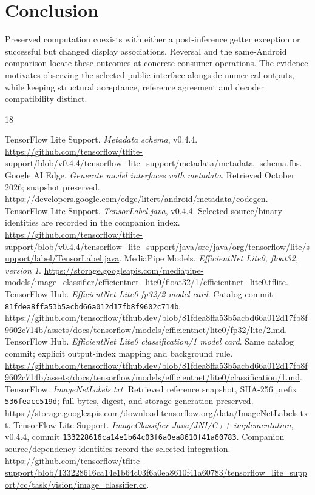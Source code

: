 \documentclass[10pt,conference]{IEEEtran}
\newcommand{\code}[1]{\texttt{#1}}
\begin{document}
\section{Conclusion}
Preserved computation coexists with either a post-inference getter exception or successful but changed display associations. Reversal and the same-Android comparison locate these outcomes at concrete consumer operations. The evidence motivates observing the selected public interface alongside numerical outputs, while keeping structural acceptance, reference agreement and decoder compatibility distinct.

\begin{thebibliography}{18}\small\raggedright
{} TensorFlow Lite Support. \emph{Metadata schema}, v0.4.4. \url{https://github.com/tensorflow/tflite-support/blob/v0.4.4/tensorflow_lite_support/metadata/metadata_schema.fbs}.
 Google AI Edge. \emph{Generate model interfaces with metadata}. Retrieved October 2026; snapshot preserved. \url{https://developers.google.com/edge/litert/android/metadata/codegen}.
 TensorFlow Lite Support. \emph{TensorLabel.java}, v0.4.4. Selected source/binary identities are recorded in the companion index. \url{https://github.com/tensorflow/tflite-support/blob/v0.4.4/tensorflow_lite_support/java/src/java/org/tensorflow/lite/support/label/TensorLabel.java}.
 MediaPipe Models. \emph{EfficientNet Lite0, float32, version 1}. \url{https://storage.googleapis.com/mediapipe-models/image_classifier/efficientnet_lite0/float32/1/efficientnet_lite0.tflite}.
 TensorFlow Hub. \emph{EfficientNet Lite0 fp32/2 model card}. Catalog commit \code{81fdea8ffa53b5acbd66a012d17fb8f9602c714b}. \url{https://github.com/tensorflow/tfhub.dev/blob/81fdea8ffa53b5acbd66a012d17fb8f9602c714b/assets/docs/tensorflow/models/efficientnet/lite0/fp32/lite/2.md}.
 TensorFlow Hub. \emph{EfficientNet Lite0 classification/1 model card}. Same catalog commit; explicit output-index mapping and background rule. \url{https://github.com/tensorflow/tfhub.dev/blob/81fdea8ffa53b5acbd66a012d17fb8f9602c714b/assets/docs/tensorflow/models/efficientnet/lite0/classification/1.md}.
 TensorFlow. \emph{ImageNetLabels.txt}. Retrieved reference snapshot, SHA-256 prefix \code{536feacc519d}; full bytes, digest, and storage generation preserved. \url{https://storage.googleapis.com/download.tensorflow.org/data/ImageNetLabels.txt}.
 TensorFlow Lite Support. \emph{ImageClassifier Java/JNI/C++ implementation}, v0.4.4, commit \code{133228616ca14e1b64c03f6a0ea8610f41a60783}. Companion source/dependency identities record the selected integration. \url{https://github.com/tensorflow/tflite-support/blob/133228616ca14e1b64c03f6a0ea8610f41a60783/tensorflow_lite_support/cc/task/vision/image_classifier.cc}.

\end{thebibliography}
\end{document}
